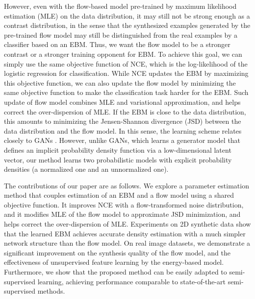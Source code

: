 \documentclass[10pt,twocolumn,letterpaper]{article}
\begin{document}
However, even with the flow-based model pre-trained by maximum likelihood estimation (MLE) on the data distribution, it may still not be strong enough as a contrast distribution, in the sense that the synthesized examples generated by the pre-trained flow model may still be distinguished from the real examples by a classifier based on an EBM.  Thus, we want the flow model to be a stronger contrast or a stronger training opponent for EBM. To achieve this goal, we can simply use the same objective function of NCE, which is the log-likelihood of the logistic regression for classification. While NCE updates the EBM by maximizing this objective function, we can also update the flow model by minimizing the same objective function to make the classification task harder for the EBM. Such update of flow model combines MLE and variational approximation, and helps correct the over-dispersion of MLE.  If the EBM is close to the data distribution, this amounts to minimizing the Jensen-Shannon divergence (JSD) \cite{goodfellow2014generative} between the data distribution and the flow model.  In this sense, the learning scheme relates closely to GANs \cite{goodfellow2014generative}. However, unlike GANs, which learns a generator model that defines an implicit probability density
 function via a low-dimensional latent vector, our method learns two probabilistic models with explicit probability densities (a normalized one and an unnormalized one). 
 
The contributions of our paper are as follows. We explore a parameter estimation method that couples estimation of an EBM and a flow model using a shared objective function. It improves NCE with a flow-transformed noise distribution, and it modifies MLE of the flow model to approximate JSD minimization, and helps correct the over-dispersion of MLE. Experiments on 2D synthetic data show that the learned EBM achieves accurate density estimation with a much simpler network structure than the flow model. On real image datasets, we demonstrate a significant improvement on the synthesis quality of the flow model, and the effectiveness of unsupervised feature learning by the energy-based model. Furthermore, we show that the proposed method can be easily adapted to semi-supervised learning, achieving performance comparable to state-of-the-art semi-supervised methods. 
\end{document}
